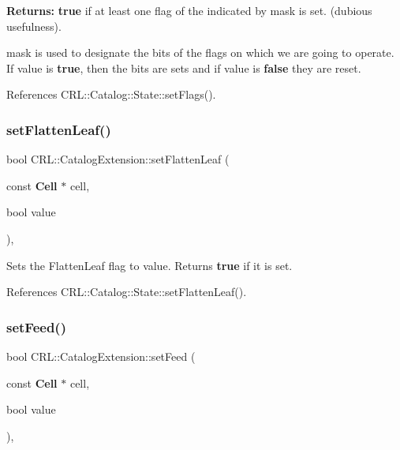 {\bfseries Returns\+:} {\bfseries true} if at least one flag of the indicated by mask is set. (dubious usefulness).

{\ttfamily mask} is used to designate the bits of the flags on which we are going to operate. If {\ttfamily value} is {\bfseries true}, then the bits are sets and if {\ttfamily value} is {\bfseries false} they are reset. 

References C\+R\+L\+::\+Catalog\+::\+State\+::set\+Flags().

\mbox{\label{classCRL_1_1CatalogExtension_a00772e9c455d0e44caf132ee724b958d}} 
\subsubsection{\texorpdfstring{set\+Flatten\+Leaf()}{setFlattenLeaf()}}
{\footnotesize\ttfamily bool C\+R\+L\+::\+Catalog\+Extension\+::set\+Flatten\+Leaf (\begin{DoxyParamCaption}\item[{const \textbf{ Cell} $\ast$}]{cell,  }\item[{bool}]{value }\end{DoxyParamCaption})\hspace{0.3cm}{\ttfamily [inline]}, {\ttfamily [static]}}

Sets the Flatten\+Leaf flag to {\ttfamily value}. Returns {\bfseries true} if it is set. 

References C\+R\+L\+::\+Catalog\+::\+State\+::set\+Flatten\+Leaf().

\mbox{\label{classCRL_1_1CatalogExtension_ab82e4b139ca636feaca5d97836891b68}} 
\subsubsection{\texorpdfstring{set\+Feed()}{setFeed()}}
{\footnotesize\ttfamily bool C\+R\+L\+::\+Catalog\+Extension\+::set\+Feed (\begin{DoxyParamCaption}\item[{const \textbf{ Cell} $\ast$}]{cell,  }\item[{bool}]{value }\end{DoxyParamCaption})\hspace{0.3cm}{\ttfamily [inline]}, {\ttfamily [static]}}

